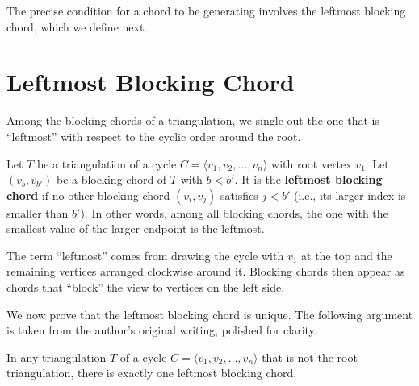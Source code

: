 The precise condition for a chord to be generating involves the leftmost blocking chord, which we define next.

\section{Leftmost Blocking Chord}
\label{sec:leftmost_blocking}

Among the blocking chords of a triangulation, we single out the one that is ``leftmost'' with respect to the cyclic order around the root.

\begin{definition}
    \label{def:leftmost_blocking}
    Let \(T\) be a triangulation of a cycle \(C = \langle v_1, v_2, \ldots, v_n \rangle\) with root vertex \(v_1\). 
    Let \((v_b, v_{b'})\) be a blocking chord of \(T\) with \(b < b'\). 
    It is the \textbf{leftmost blocking chord} if no other blocking chord \((v_i, v_j)\) satisfies \(j < b'\) (i.e., its larger index is smaller than \(b'\)). 
    In other words, among all blocking chords, the one with the smallest value of the larger endpoint is the leftmost.
\end{definition}

\begin{remark}
    The term ``leftmost'' comes from drawing the cycle with \(v_1\) at the top and the remaining vertices arranged clockwise around it. 
    Blocking chords then appear as chords that ``block'' the view to vertices on the left side.
\end{remark}

We now prove that the leftmost blocking chord is unique. 
The following argument is taken from the author’s original writing, polished for clarity.

\begin{lemma}
    \label{lem:unique_leftmost}
    In any triangulation \(T\) of a cycle \(C = \langle v_1, v_2, \ldots, v_n \rangle\) that is not the root triangulation, there is exactly one leftmost blocking chord.
\end{lemma}

